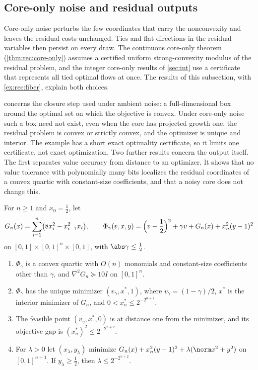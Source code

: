 \subsection{Core-only noise and residual outputs}\label{sec:lim:points}

Core-only noise perturbs the few coordinates that carry the nonconvexity
and leaves the residual costs unchanged. Ties and flat directions in the
residual variables then persist on every draw. The continuous core-only
theorem (\cref{thm:rec:core-only}) assumes a certified uniform
strong-convexity modulus of the residual problem, and the integer core-only
results of \cref{sec:int} use a certificate that represents all tied
optimal flows at once. The results of this subsection, with
\cref{ex:rec:fiber}, explain both choices.

 concerns the closure step used under ambient noise: a
full-dimensional box around the optimal set on which the objective is
convex. Under core-only noise such a box need not exist, even when the core
has projected growth one, the residual problem is convex or strictly convex,
and the optimizer is unique and interior. The example has a short exact
optimality certificate, so it limits one certificate, not exact
optimization. Two further results concern the output itself. The first
separates value accuracy from distance to an optimizer. It shows that no
value tolerance with polynomially many bits localizes the residual
coordinates of a convex quartic with constant-size coefficients, and that a
noisy core does not change this.

\begin{proposition}\label{prop:lim:value}
For $n\ge1$ and $x_0=\frac12$, let
\[
 G_n(x)=\sum_{i=1}^n\bigl(8x_i^2-x_{i-1}^2x_i\bigr),\qquad
 \Phi_\gamma(v,x,y)=\Bigl(v-\frac12\Bigr)^2+\gamma v+G_n(x)+x_n^2(y-1)^2
\]
on $[0,1]\times[0,1]^n\times[0,1]$, with $\abs\gamma\le\frac12$.
\begin{enumerate}[label=(\alph*)]
\item\label{it:lim:val-convex} $\Phi_\gamma$ is a convex quartic with
$O(n)$ monomials and constant-size coefficients other than $\gamma$, and
$\nabla^2G_n\succeq10I$ on $[0,1]^n$.
\item\label{it:lim:val-opt} $\Phi_\gamma$ has the unique minimizer
$(v_\gamma,x^*,1)$, where $v_\gamma=(1-\gamma)/2$, $x^*$ is the interior
minimizer of $G_n$, and $0<x_n^*\le2^{-2^{n+1}}$.
\item\label{it:lim:val-gap} The feasible point $(v_\gamma,x^*,0)$ is at
distance one from the minimizer, and its objective gap is
$(x_n^*)^2\le2^{-2^{n+2}}$.
\item\label{it:lim:val-tikhonov} For $\lambda>0$ let $(x_\lambda,y_\lambda)$
minimize $G_n(x)+x_n^2(y-1)^2+\lambda(\norm x^2+y^2)$ on $[0,1]^{n+1}$. If
$y_\lambda\ge\frac12$, then $\lambda\le2^{-2^{n+2}}$.
\end{enumerate}
\end{proposition}

